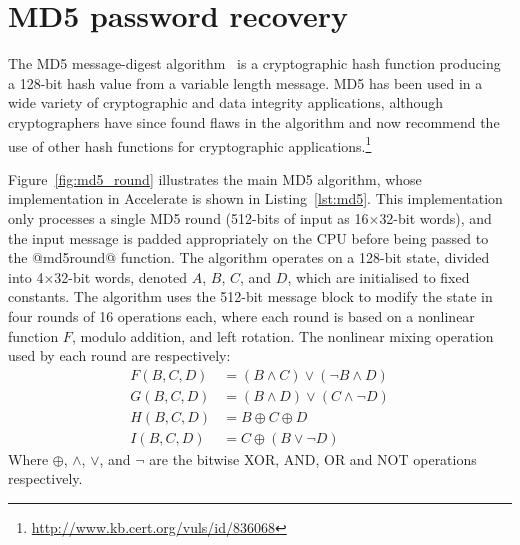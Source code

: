\section{MD5 password recovery}

The MD5 message-digest algorithm~\cite{Rivest:1992va} is a cryptographic hash
function producing a 128-bit hash value from a variable length message. MD5 has
been used in a wide variety of cryptographic and data integrity applications,
although cryptographers have since found flaws in the algorithm and now
recommend the use of other hash functions for cryptographic
applications.\footnote{\url{http://www.kb.cert.org/vuls/id/836068}}

Figure~\ref{fig:md5_round} illustrates the main MD5 algorithm, whose
implementation in Accelerate is shown in Listing~\ref{lst:md5}. This
implementation only processes a single MD5 round (512-bits of input as
16$\times$32-bit words), and the input message is padded appropriately on the
CPU before being passed to the @md5round@ function. The algorithm operates on a
128-bit state, divided into 4$\times$32-bit words, denoted $A$, $B$, $C$, and
$D$, which are initialised to fixed constants. The algorithm uses the 512-bit
message block to modify the state in four rounds of 16 operations each, where
each round is based on a nonlinear function $F$, modulo addition, and left
rotation. The nonlinear mixing operation used by each round are respectively:
%
\begin{align*}
    F(B,C,D) &= (B \wedge C) \vee (\neg B \wedge D) \\
    G(B,C,D) &= (B \wedge D) \vee (C \wedge \neg D) \\
    H(B,C,D) &= B \oplus C \oplus D \\
    I(B,C,D) &= C \oplus (B \vee \neg D)
\end{align*}
%
Where $\oplus$, $\wedge$, $\vee$, and $\neg$ are the bitwise XOR, AND, OR and
NOT operations respectively.


